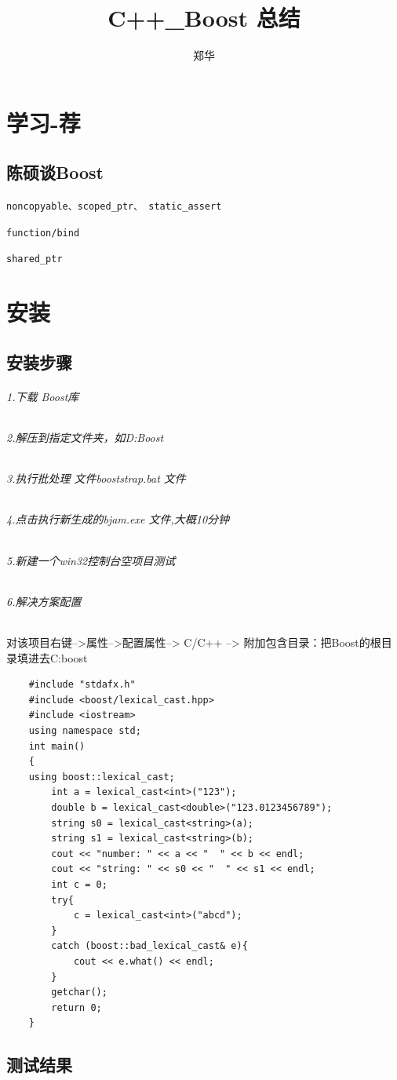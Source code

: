 \documentclass[UTF8,a4paper,12pt]{ctexbook}
\author{\kaishu 郑华}
\title{\textbf{C++\_Boost 总结}}
\begin{document}
 
 	\maketitle
	\tableofcontents
\newpage 

\chapter{学习-荐}
	\section{陈硕谈Boost}
		\verb|noncopyable、scoped_ptr、 static_assert|
		
		\verb|function/bind|
		
		\verb|shared_ptr|

\chapter{安装}
	 \section{安装步骤}
		 \subparagraph{1.下载 Boost库}
		 \subparagraph{2.解压到指定文件夹，如D:Boost}
		 \subparagraph{3.执行批处理 文件booststrap.bat 文件}
		 \subparagraph{4.点击执行新生成的bjam.exe 文件,大概10分钟}
		 \subparagraph{5.新建一个win32控制台空项目测试}
		 \subparagraph{6.解决方案配置}
			 对该项目右键-->属性-->配置属性--> C/C++ --> 附加包含目录：把Boost的根目录填进去C:boost
		 
		 \begin{lstlisting}
	#include "stdafx.h"
	#include <boost/lexical_cast.hpp>     
	#include <iostream>     
	using namespace std;
	int main()
	{
	using boost::lexical_cast;
		int a = lexical_cast<int>("123");
		double b = lexical_cast<double>("123.0123456789");
		string s0 = lexical_cast<string>(a);
		string s1 = lexical_cast<string>(b);
		cout << "number: " << a << "  " << b << endl;
		cout << "string: " << s0 << "  " << s1 << endl;
		int c = 0;
		try{
			c = lexical_cast<int>("abcd");
		}
		catch (boost::bad_lexical_cast& e){
			cout << e.what() << endl;
		}
		getchar();
		return 0;
	}		
		 \end{lstlisting}
	 
	 \section{测试结果}
	 
\end{document}
